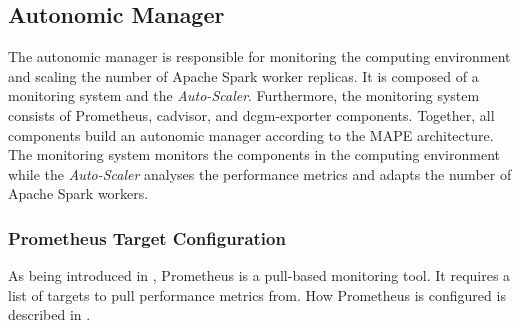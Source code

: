 \subsection{Autonomic Manager}
The autonomic manager is responsible for monitoring the computing environment and scaling the number of Apache Spark worker replicas.
It is composed of a monitoring system and the \textit{Auto-Scaler}.
Furthermore, the monitoring system consists of Prometheus, cadvisor, and dcgm-exporter components.
Together, all components build an autonomic manager according to the MAPE architecture.
The monitoring system monitors the components in the computing environment while the \textit{Auto-Scaler} analyses the performance metrics and adapts the number of Apache Spark workers.


\subsubsection{Prometheus Target Configuration}




As being introduced in , Prometheus is a pull-based monitoring tool.
It requires a list of targets to pull performance metrics from. How Prometheus is configured is described in .


